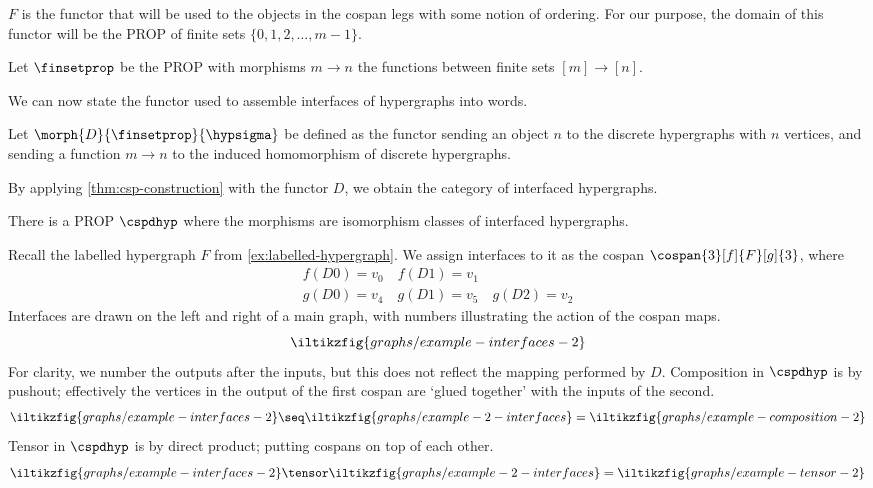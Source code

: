 \(F\) is the functor that will be used to the objects in the cospan legs with
some notion of ordering.
For our purpose, the domain of this functor will be the PROP of finite sets
\(\{0,1,2,\dots,m-1\}\).

\begin{definition}
    Let \(\finsetprop\) be the PROP with morphisms \(m \to n\) the functions
    between finite sets \([m] \to [n]\).
\end{definition}

We can now state the functor used to assemble interfaces of hypergraphs into
words.

\begin{definition}
    Let \(\morph{D}{\finsetprop}{\hypsigma}\) be defined as the functor sending
    an object \(n\) to the discrete hypergraphs with \(n\) vertices, and sending
    a function \(m \to n\) to the induced homomorphism of discrete
    hypergraphs.
\end{definition}

By applying \cref{thm:csp-construction} with the functor \(D\), we obtain the
category of interfaced hypergraphs.

\begin{corollary}
    There is a PROP \(\cspdhyp\) where the morphisms are isomorphism classes of
    interfaced hypergraphs.
\end{corollary}

\begin{example}
    Recall the labelled hypergraph \(F\) from \cref{ex:labelled-hypergraph}.
    We assign interfaces to it as the cospan \(\cospan{3}[f]{F}[g]{3}\), where
    \begin{gather*}
        f(D0) = v_0 \quad f(D1) = v_1 \\
        g(D0) = v_4 \quad g(D1) = v_5 \quad g(D2) = v_2
    \end{gather*}
    Interfaces are drawn on the left and right of a main graph, with numbers
    illustrating the action of the cospan maps.
    \[
        \iltikzfig{graphs/example-interfaces-2}
    \]
    For clarity, we number the outputs after the inputs, but this does not
    reflect the mapping performed by \(D\).
    Composition in \(\cspdhyp\) is by pushout; effectively the vertices in the
    output of the first cospan are `glued together' with the inputs of the
    second.
    \begin{gather*}
        \iltikzfig{graphs/example-interfaces-2}
        \seq
        \iltikzfig{graphs/example-2-interfaces}
        =
        \iltikzfig{graphs/example-composition-2}
    \end{gather*}
    Tensor in \(\cspdhyp\) is by direct product; putting cospans on top of each
    other.
    \[
        \iltikzfig{graphs/example-interfaces-2}
        \tensor
        \iltikzfig{graphs/example-2-interfaces}
        =
        \iltikzfig{graphs/example-tensor-2}
    \]
\end{example}

